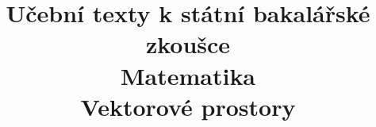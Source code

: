 \clearpage

\clearpage

\title{\LARGE Učební texty k státní bakalářské zkoušce \\ Matematika \\ Vektorové prostory}



\maketitle

\newpage
\setcounter{section}{8}



